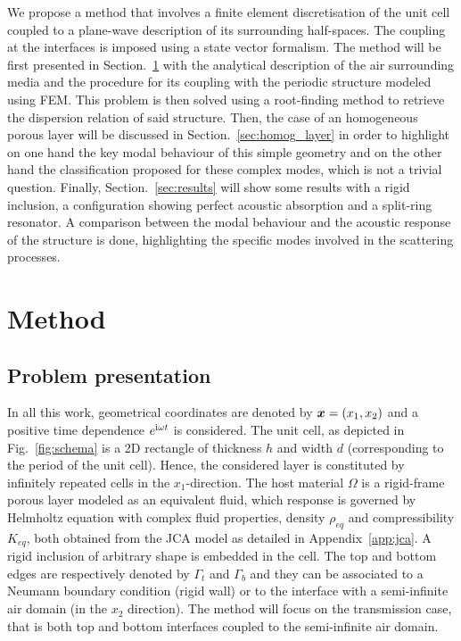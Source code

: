 We propose a method that involves a finite element discretisation of the unit cell coupled to a plane-wave description of its surrounding half-spaces. The coupling at the interfaces is imposed using a state vector formalism. The method will be first presented in Section.~\ref{sec:method} with the analytical description of the air surrounding media and the procedure for its coupling with the periodic structure modeled using FEM. This problem is then solved using a root-finding method to retrieve the dispersion relation of said structure. Then, the case of an homogeneous porous layer will be discussed in Section.~\ref{sec:homog_layer} in order to highlight on one hand the key modal behaviour of this simple geometry and on the other hand the classification proposed for these complex modes, which is not a trivial question. Finally, Section.~\ref{sec:results} will show some results with a rigid inclusion, a configuration showing perfect acoustic absorption and a split-ring resonator. A comparison between the modal behaviour and the acoustic response of the structure is done, highlighting the specific modes involved in the scattering processes.


\section{Method}\label{sec:method} 

\subsection{Problem presentation}
\label{ssec:pb_pres}
In all this work, geometrical coordinates are denoted by $\boldsymbol x = (x_1, x_2)$ and a positive time dependence $e^{\mathrm i \omega t}$ is considered. The unit cell, as depicted in Fig.~\ref{fig:schema} is a 2D rectangle of thickness $h$ and width $d$ (corresponding to the period of the unit cell). Hence, the considered layer is constituted by  infinitely repeated cells in the $x_1$-direction. The host material $\Omega$ is a rigid-frame porous layer modeled as an equivalent fluid, which response is governed by Helmholtz equation with complex fluid properties, density $\rho_{eq}$ and compressibility $K_{eq}$, both obtained from the JCA model \cite{johnson1987, champoux1991} as detailed in Appendix~\ref{app:jca}. A rigid inclusion of arbitrary shape is embedded in the cell. The top and bottom edges are respectively denoted by $\Gamma_t$ and $\Gamma_b$ and they can be associated to a Neumann boundary condition (rigid wall) or to the interface with a semi-infinite air domain (in the $x_2$ direction). The method will focus on the transmission case, that is both top and bottom interfaces coupled to the semi-infinite air domain.\\

